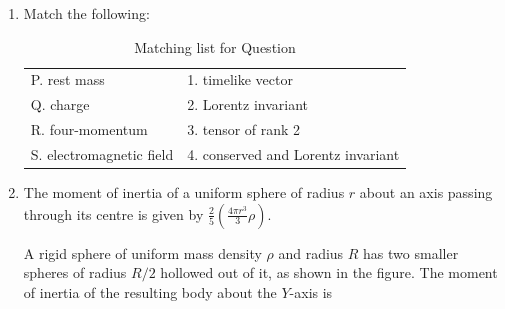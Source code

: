\documentclass[journal,12pt,onecolumn]{IEEEtran}
\begin{document}
\begin{enumerate}[itemsep = 1em]
\hfill{}

\begin{enumerate}
\end{enumerate}

\item Match the following:

\begin{table}[H]
\centering
\caption{Matching list for Question \theenumi}
\label{tab:q29}
\begin{tabular}{|l|l|}
\hline
P. rest mass & 1. timelike vector \\
Q. charge & 2. Lorentz invariant \\
R. four-momentum & 3. tensor of rank 2 \\
S. electromagnetic field & 4. conserved and Lorentz invariant \\
\hline
\end{tabular}
\end{table}

\hfill{}

\vspace{1em}

\begin{enumerate}
\end{enumerate}

\vspace{2em}

\item The moment of inertia of a uniform sphere of radius $r$ about an axis passing through its centre is given by $\frac{2}{5}\left(\frac{4\pi r^3}{3}\rho\right)$.

A rigid sphere of uniform mass density $\rho$ and radius $R$ has two smaller spheres of radius $R/2$ hollowed out of it, as shown in the figure. The moment of inertia of the resulting body about the $Y$-axis is


\end{enumerate}
\end{document}
